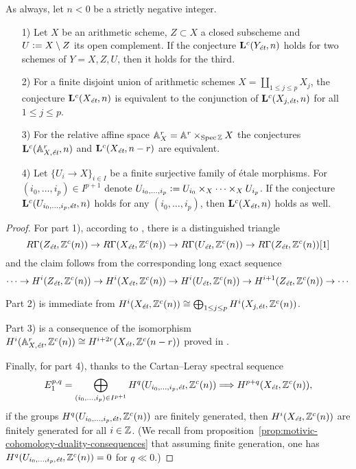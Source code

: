\documentclass{article}
\numberwithin{equation}{section}
\begin{document}
\begin{lemma}
  \label{lemma:Lc(Xet)-operations}
  As always, let $n < 0$ be a strictly negative integer.

  \begin{enumerate}
  \item[1)] Let $X$ be an arithmetic scheme, $Z \subset X$ a closed subscheme
    and $U \dfn X\setminus Z$ its open complement. If the conjecture
    $\mathbf{L}^c (Y_\et,n)$ holds for two schemes of $Y = X,Z,U$, then it holds
    for the third.

  \item[2)] For a finite disjoint union of arithmetic schemes
    $X = \coprod_{1 \le j \le p} X_j$, the conjecture $\mathbf{L}^c (X_\et,n)$
    is equivalent to the conjunction of $\mathbf{L}^c (X_{j,\et},n)$ for all
    $1 \le j \le p$.

  \item[3)] For the relative affine space $\AA^r_X = \AA^r \times_{\Spec \ZZ} X$
    the conjectures $\mathbf{L}^c (\AA^r_{X,\et},n)$ and
    $\mathbf{L}^c (X_\et,n-r)$ are equivalent.

  \item[4)] Let $\{ U_i \to X \}_{i \in I}$ be a finite surjective family of
    étale morphisms. For $(i_0,\ldots,i_p) \in I^{p+1}$ denote
    $U_{i_0,\ldots,i_p} \dfn U_{i_0} \times_X \cdots \times_X U_{i_p}$.
    If the conjecture $\mathbf{L}^c (U_{i_0,\ldots,i_p, \et},n)$ holds for any
    $(i_0,\ldots,i_p)$, then $\mathbf{L}^c (X_\et,n)$ holds as well.
  \end{enumerate}

  \begin{proof}
    For part 1), according to \cite[Corollary~7.2]{Geisser-2010}, there is a
    distinguished triangle
    \[ R\Gamma (Z_\et, \ZZ^c (n)) \to
       R\Gamma (X_\et, \ZZ^c (n)) \to
       R\Gamma (U_\et, \ZZ^c (n)) \to
       R\Gamma (Z_\et, \ZZ^c (n)) [1] \]
    and the claim follows from the corresponding long exact sequence
    \[ \cdots \to H^i (Z_\et, \ZZ^c (n)) \to
       H^i (X_\et, \ZZ^c (n)) \to
       H^i (U_\et, \ZZ^c (n)) \to
       H^{i+1} (Z_\et, \ZZ^c (n)) \to \cdots \]

    Part 2) is immediate from
    $H^i (X_\et, \ZZ^c (n)) \cong \bigoplus_{1 \le j \le p} H^i (X_{j,\et}, \ZZ^c (n))$.

    Part 3) is a consequence of the isomorphism
    $H^i (\AA^r_{X,\et}, \ZZ^c (n)) \cong H^{i+2r} (X_\et, \ZZ^c (n-r))$
    proved in \cite[Lemma~5.11]{Morin-2014}.

    Finally, for part 4), thanks to the Cartan--Leray spectral sequence
    \[ E_1^{p,q} = \bigoplus_{(i_0,\ldots,i_p) \in I^{p+1}} H^q (U_{i_0,\ldots,i_p, \et}, \ZZ^c (n))
      \Longrightarrow H^{p+q} (X_\et, \ZZ^c (n)), \]
    if the groups $H^q (U_{i_0,\ldots,i_p, \et}, \ZZ^c (n))$ are finitely
    generated, then $H^i (X_\et, \ZZ^c (n))$ are finitely generated for all
    $i\in \ZZ$.
    (We recall from
    proposition~\ref{prop:motivic-cohomology-duality-consequences} that assuming
    finite generation, one has $H^q (U_{i_0,\ldots,i_p, \et}, \ZZ^c (n)) = 0$
    for $q \ll 0$.)
  \end{proof}
\end{lemma}
\end{document}
